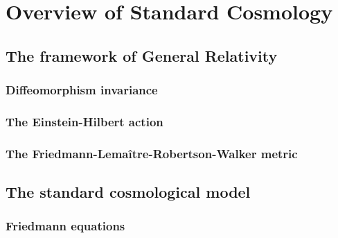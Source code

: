 
\chapter{Overview of Standard Cosmology} %

\label{Overview} %


\newcommand{\keyword}[1]{\textbf{#1}}
\newcommand{\tabhead}[1]{\textbf{#1}}
\newcommand{\code}[1]{\texttt{#1}}
\newcommand{\file}[1]{\texttt{\bfseries#1}}
\newcommand{\option}[1]{\texttt{\itshape#1}}


\section{The framework of General Relativity}

\subsection{Diffeomorphism invariance}

\subsection{The Einstein-Hilbert action}

\subsection{The Friedmann-Lemaître-Robertson-Walker metric}




\section{The standard cosmological model}

\subsection{Friedmann equations}

